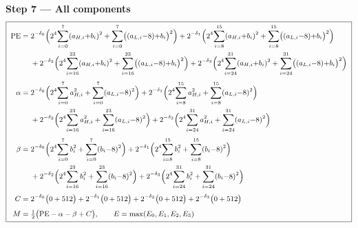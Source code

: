 \documentclass[fleqn]{article}
\begin{document}
\textbf{Step 7 --- All components}
{\setlength{\mathindent}{0em}
\[
\small
\boxed{\;
\begin{aligned}
\mathrm{PE} ={}& 2^{-\delta_0}\Big(2^{4}\!\sum_{i=0}^{7}(a_{H,i}{+}b_i)^2 + \sum_{i=0}^{7}\!\big((a_{L,i}{-}8){+}b_i\big)^2\Big) + 2^{-\delta_1}\Big(2^{4}\!\sum_{i=8}^{15}(a_{H,i}{+}b_i)^2 + \sum_{i=8}^{15}\!\big((a_{L,i}{-}8){+}b_i\big)^2\Big) \\
  & + 2^{-\delta_2}\Big(2^{4}\!\sum_{i=16}^{23}(a_{H,i}{+}b_i)^2 + \sum_{i=16}^{23}\!\big((a_{L,i}{-}8){+}b_i\big)^2\Big) + 2^{-\delta_3}\Big(2^{4}\!\sum_{i=24}^{31}(a_{H,i}{+}b_i)^2 + \sum_{i=24}^{31}\!\big((a_{L,i}{-}8){+}b_i\big)^2\Big) \\[0.3em]
\alpha ={}& 2^{-\delta_0}\Big(2^{4}\!\sum_{i=0}^{7} a_{H,i}^2 + \sum_{i=0}^{7}(a_{L,i}{-}8)^2\Big) + 2^{-\delta_1}\Big(2^{4}\!\sum_{i=8}^{15} a_{H,i}^2 + \sum_{i=8}^{15}(a_{L,i}{-}8)^2\Big) \\
  & + 2^{-\delta_2}\Big(2^{4}\!\sum_{i=16}^{23} a_{H,i}^2 + \sum_{i=16}^{23}(a_{L,i}{-}8)^2\Big) + 2^{-\delta_3}\Big(2^{4}\!\sum_{i=24}^{31} a_{H,i}^2 + \sum_{i=24}^{31}(a_{L,i}{-}8)^2\Big) \\[0.3em]
\beta ={}& 2^{-\delta_0}\Big(2^{4}\!\sum_{i=0}^{7} b_i^2 + \sum_{i=0}^{7}(b_i{-}8)^2\Big) + 2^{-\delta_1}\Big(2^{4}\!\sum_{i=8}^{15} b_i^2 + \sum_{i=8}^{15}(b_i{-}8)^2\Big) \\
  & + 2^{-\delta_2}\Big(2^{4}\!\sum_{i=16}^{23} b_i^2 + \sum_{i=16}^{23}(b_i{-}8)^2\Big) + 2^{-\delta_3}\Big(2^{4}\!\sum_{i=24}^{31} b_i^2 + \sum_{i=24}^{31}(b_i{-}8)^2\Big) \\[0.3em]
C ={}& 2^{-\delta_0}\big(0+512\big) + 2^{-\delta_1}\big(0+512\big) + 2^{-\delta_2}\big(0+512\big) + 2^{-\delta_3}\big(0+512\big) \\[0.3em]
M ={}& \tfrac12\big(\mathrm{PE} - \alpha - \beta + C\big), \qquad E = \max(E_0,E_1,E_2,E_3)
\end{aligned}
\;}
\]
}
\end{document}
